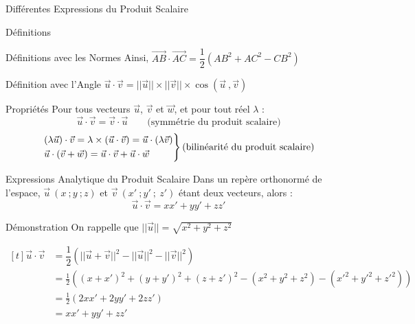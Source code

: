 \documentclass{cours}
\begin{document}
\begin{Gpartie}{Différentes Expressions du Produit Scalaire}
\begin{Spartie}{Définitions}
\begin{SSpartie}{Définitions avec les Normes}
                Ainsi, $\overrightarrow{AB}\cdot\overrightarrow{AC}=\dfrac{1}{2}\left(AB^2+AC^2-CB^2\right)$
            \end{SSpartie}
            \begin{SSpartie}{Définition avec l'Angle} 
                $\vec{u}\cdot\vec{v}=\lvert\lvert\vec{u}\rvert\rvert\times\lvert\lvert\vec{v}\rvert\rvert\times\cos\left(\vec{u}~,\vec{v}\right)$
            \end{SSpartie}
        \end{Spartie}
        \begin{Spartie}{Propriétés} 
            Pour tous vecteurs $\vec{u}$, $\vec{v}$ et $\vec{w}$, et pour tout réel $\lambda$ : \[\vec{u}\cdot\vec{v}=\vec{v}\cdot\vec{u}\qquad\text{(symmétrie du produit scalaire)}\] \[\begin{drcases}\left(\lambda\vec{u}\right)\cdot\vec{v}=\lambda\times\left(\vec{u}\cdot\vec{v}\right)=\vec{u}\cdot\left(\lambda\vec{v}\right) \\ \vec{u}\cdot\left(\vec{v}+\vec{w}\right)=\vec{u}\cdot\vec{v}+\vec{u}\cdot\vec{w}\end{drcases}\text{(bilinéarité du produit scalaire)}\]
        \end{Spartie}
        \begin{Spartie}{Expressions Analytique du Produit Scalaire} 
            Dans un repère orthonormé de l'espace, $\vec{u}~(x~;y~;z)$ et $\vec{v}~(x'~;y'~;~z')$ étant deux vecteurs, alors : \[\vec{u}\cdot\vec{v}=xx'+yy'+zz'\] 
            \begin{SSpartie}{Démonstration} 
                On rappelle que $\lvert\lvert\vec{u}\rvert\rvert=\sqrt{x^2+y^2+z^2}$

                $\begin{aligned}[t]
                    \vec{u}\cdot\vec{v}&=\dfrac{1}{2}\left(\lvert\lvert\vec{u}+\vec{v}\rvert\rvert^2-\lvert\lvert\vec{u}\rvert\rvert^2-\lvert\lvert\vec{v}\rvert\rvert^2\right) \\
                    &=\frac{1}{2}\left(\left(x+x'\right)^2+\left(y+y'\right)^2+\left(z+z'\right)^2-\left(x^2+y^2+z^2\right)-\left(x'^2+y'^2+z'^2\right)\right) \\
                    &=\frac{1}{2}\left(2xx'+2yy'+2zz'\right) \\
                    &=xx'+y y'+z z'
                \end{aligned}$
            \end{SSpartie}
        \end{Spartie}
    \end{Gpartie}
\end{document}
